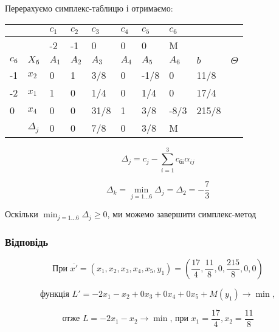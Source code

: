 \documentclass[a4paper, 12pt]{article}
\begin{document}
Перерахуємо симплекс-таблицю і отримаємо:

\begin{table}[H]
    \centering
    \begin{tabular}{|l|l|l|l|l|l|l|l|l|l|}
    \hline
         &  & $c_1$ & $c_2$ & $c_3$ & $c_4$ & $c_5$ & $c_6$ & & \\ \hline
         &  & -2 & -1 & 0 & 0 & 0 & M &  &  \\ \hline
         $c_\text{б}$ & $X_\text{б}$ & $A_1$ & $A_2$ & $A_3$ & $A_4$ & $A_5$ & $A_6$ & $b$  & $\Theta$ \\ \hline
        -1 & $x_2$ & 0 & 1 & 3/8 & 0 & -1/8 & 0 & 11/8 & \\ \hline
        -2 & $x_1$ & 1 & 0 & 1/4 & 0 & 1/4 & 0 & 17/4	 & \\ \hline
        0 & $x_4$ & 0 & 0 & 31/8 & 1 & 3/8 & -8/3 & 215/8 & \\ \hline
         & $\Delta_j$ & 0 & 0 & 7/8 & 0 & 3/8 & M &  &  \\ \hline
    \end{tabular}
\end{table}

\begin{equation*}
	\Delta_j = c_j - \sum_{i=1}^{3} c_\text{бi} \alpha_{ij}  
\end{equation*}

\begin{equation*}
	\Delta_k = \min_{j=1 \dots 6} \Delta_j = \Delta_2 = -\frac{7}{3}
\end{equation*}

Оскільки $\min_{j=1 \dots 6} \Delta_j \geqslant 0$, ми можемо завершити симплекс-метод

\subsubsection{Відповідь}


\begin{equation*}
\text{При }\overline{x'} = \left(x_1, x_2, x_3, x_4, x_5, y_1\right) = \left(\frac{17}{4},\frac{11}{8}, 0, \frac{215}{8}, 0, 0\right)
\end{equation*}

\begin{equation*}
\text{функція }L' = -2x_1 - x_2 + 0x_3 + 0x_4 + 0x_5 + M(y_1) \rightarrow \min,
\end{equation*}


\begin{equation*}
\text{отже }L = -2x_1 - x_2 \rightarrow \min \text{, при } x_1 = \frac{17}{4}, x_2 = \frac{11}{8}
\end{equation*}
\end{document}
